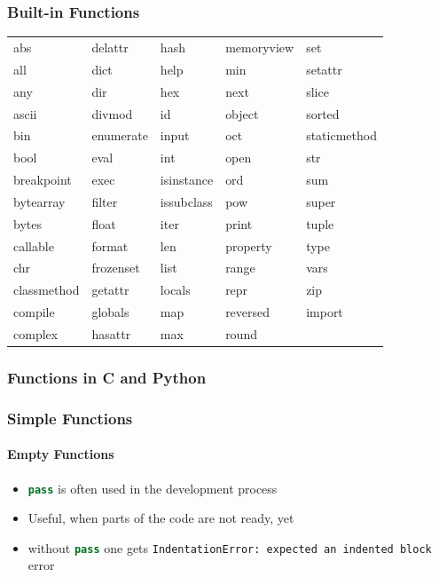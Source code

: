 \documentclass[ngerman]{beamer}
\newcommand{\ta}[1]{\textattachfile[color=1 0 0]{#1}{Code}}
\begin{document}
\begin{frame}
\frametitle{Built-in Functions}

\begin{tabular}{lllll}
abs	&	delattr	&	hash	&	memoryview	&	set	\\
all	&	dict	&	help	&	min	&	setattr	\\
any	&	dir	&	hex	&	next	&	slice	\\
ascii	&	divmod	&	id	&	object	&	sorted	\\
bin	&	enumerate	&	input	&	oct	&	staticmethod	\\
bool	&	eval	&	int	&	open	&	str	\\
breakpoint	&	exec	&	isinstance	&	ord	&	sum	\\
bytearray	&	filter	&	issubclass	&	pow	&	super	\\
bytes	&	float	&	iter	&	print	&	tuple	\\
callable	&	format	&	len	&	property	&	type	\\
chr	&	frozenset	&	list	&	range	&	vars	\\
classmethod	&	getattr	&	locals	&	repr	&	zip	\\
compile	&	globals	&	map	&	reversed	&	\textunderscore \textunderscore import \textunderscore \textunderscore	\\
complex	&	hasattr	&	max	&	round	&		\\
\end{tabular}
\end{frame}



\begin{frame}[containsverbatim]
\frametitle{Functions in C and Python}

\vspace*{-0.5em}



\end{frame}

\begin{frame}[containsverbatim]
\frametitle{Simple Functions}
\framesubtitle{Empty Functions}

\begin{itemize}
\item \lstinline[language={Python}]{pass} is often used in the development process
\item Useful, when parts of the code are not ready, yet
\item without \lstinline[language={Python}]{pass} one gets \texttt{IndentationError: expected an indented block} error
\end{itemize}



\end{frame}
\end{document}
